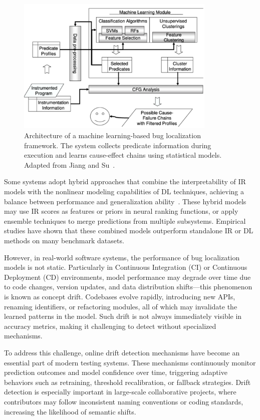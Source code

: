 \documentclass[manuscript,screen,review]{acmart}
\begin{document}
\begin{figure}[htbp]
  \centering
  \includegraphics[width=0.85\textwidth]{picture/5.1fig1.pdf}
  \caption{Architecture of a machine learning-based bug localization framework. The system collects predicate information during execution and learns cause-effect chains using statistical models. Adapted from Jiang and Su~\cite{Li2024}.}
  \label{fig:framework}
\end{figure}

Some systems adopt hybrid approaches that combine the interpretability of IR models with the nonlinear modeling capabilities of DL techniques, achieving a balance between performance and generalization ability~\cite{Li2024}. These hybrid models may use IR scores as features or priors in neural ranking functions, or apply ensemble techniques to merge predictions from multiple subsystems. Empirical studies have shown that these combined models outperform standalone IR or DL methods on many benchmark datasets.

However, in real-world software systems, the performance of bug localization models is not static. Particularly in Continuous Integration (CI) or Continuous Deployment (CD) environments, model performance may degrade over time due to code changes, version updates, and data distribution shifts---this phenomenon is known as concept drift. Codebases evolve rapidly, introducing new APIs, renaming identifiers, or refactoring modules, all of which may invalidate the learned patterns in the model. Such drift is not always immediately visible in accuracy metrics, making it challenging to detect without specialized mechanisms.

To address this challenge, online drift detection mechanisms have become an essential part of modern testing systems. These mechanisms continuously monitor prediction outcomes and model confidence over time, triggering adaptive behaviors such as retraining, threshold recalibration, or fallback strategies. Drift detection is especially important in large-scale collaborative projects, where contributors may follow inconsistent naming conventions or coding standards, increasing the likelihood of semantic shifts.
\end{document}
